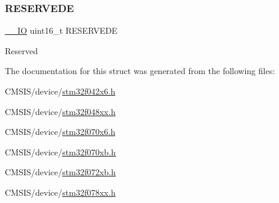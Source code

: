 \subsubsection{\texorpdfstring{R\+E\+S\+E\+R\+V\+E\+DE}{RESERVEDE}}
{\footnotesize\ttfamily \hyperlink{core__sc300_8h_aec43007d9998a0a0e01faede4133d6be}{\+\_\+\+\_\+\+IO} uint16\+\_\+t R\+E\+S\+E\+R\+V\+E\+DE}

Reserved 

The documentation for this struct was generated from the following files\+:\begin{DoxyCompactItemize}
\item 
C\+M\+S\+I\+S/device/\hyperlink{stm32f042x6_8h}{stm32f042x6.\+h}\item 
C\+M\+S\+I\+S/device/\hyperlink{stm32f048xx_8h}{stm32f048xx.\+h}\item 
C\+M\+S\+I\+S/device/\hyperlink{stm32f070x6_8h}{stm32f070x6.\+h}\item 
C\+M\+S\+I\+S/device/\hyperlink{stm32f070xb_8h}{stm32f070xb.\+h}\item 
C\+M\+S\+I\+S/device/\hyperlink{stm32f072xb_8h}{stm32f072xb.\+h}\item 
C\+M\+S\+I\+S/device/\hyperlink{stm32f078xx_8h}{stm32f078xx.\+h}\end{DoxyCompactItemize}

